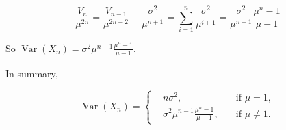\documentclass{article}
\begin{document}
\begin{equation}
    \frac{V_n}{\mu^{2n}} = \frac{V_{n-1}}{\mu^{2n-2}} + \frac{\sigma^2}{\mu^{n+1}} = \sum_{i=1}^{n} \frac{\sigma^2}{\mu^{i+1}} = \frac{\sigma^2}{\mu^{n+1}} \frac{\mu^n-1}{\mu -1}
\end{equation}

So $\operatorname{Var}(X_n) = \sigma^2 \mu^{n-1}\frac{\mu^n-1}{\mu -1}$. 

In summary,

\begin{equation}
    \operatorname{Var}(X_n) = \left\{ 
        \begin{aligned}
            &n\sigma^2, &\quad \text{if } \mu = 1, \\
            &\sigma^2 \mu^{n-1}\frac{\mu^n-1}{\mu -1}, & \quad \text{if } \mu \neq 1.
        \end{aligned}
        \right.
\end{equation}
\end{document}
